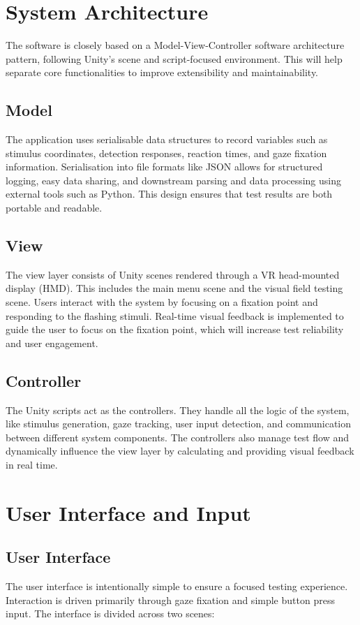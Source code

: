 \documentclass{l4proj}
\begin{document}
\section{System Architecture}
The software is closely based on a Model-View-Controller software architecture pattern, following Unity’s scene and script-focused environment. This will help separate core functionalities to improve extensibility and maintainability.  

\subsection{Model}
The application uses serialisable data structures to record variables such as stimulus coordinates, detection responses, reaction times, and gaze fixation information. Serialisation into file formats like JSON allows for structured logging, easy data sharing, and downstream parsing and data processing using external tools such as Python. This design ensures that test results are both portable and readable. 

\subsection{View}
The view layer consists of Unity scenes rendered through a VR head-mounted display (HMD). This includes the main menu scene and the visual field testing scene. Users interact with the system by focusing on a fixation point and responding to the flashing stimuli. Real-time visual feedback is implemented to guide the user to focus on the fixation point, which will increase test reliability and user engagement. 

\subsection{Controller}
The Unity scripts act as the controllers. They handle all the logic of the system, like stimulus generation, gaze tracking, user input detection, and communication between different system components. The controllers also manage test flow and dynamically influence the view layer by calculating and providing visual feedback in real time. 

\section{User Interface and Input}

\subsection{User Interface}
The user interface is intentionally simple to ensure a focused testing experience. Interaction is driven primarily through gaze fixation and simple button press input. The interface is divided across two scenes: 
\end{document}
